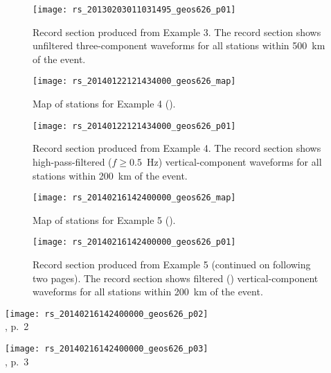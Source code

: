 \documentclass[11pt,titlepage,fleqn]{article}
\begin{document}
\clearpage\pagebreak
\begin{figure}
\hspace{-1.25cm}
\texttt{[image: rs\_20130203011031495\_geos626\_p01]}
\caption[]
{{
Record section produced from Example 3.
The record section shows unfiltered three-component waveforms for all stations within 500~km of the event.
}}
\label{fig:rs_ex03}
\end{figure}


\clearpage\pagebreak
\begin{figure}
\centering
\texttt{[image: rs\_20140122121434000\_geos626\_map]}
\caption[]
{{
Map of stations for Example 4 ().
}}
\label{fig:map_ex04}
\end{figure}

\clearpage\pagebreak
\begin{figure}
\hspace{-1.25cm}
\texttt{[image: rs\_20140122121434000\_geos626\_p01]}
\caption[]
{{
Record section produced from Example 4.
The record section shows high-pass-filtered ($f \ge 0.5$~Hz) vertical-component waveforms for all stations within 200~km of the event.
}}
\label{fig:rs_ex04}
\end{figure}


\clearpage\pagebreak
\begin{figure}
\centering
\texttt{[image: rs\_20140216142400000\_geos626\_map]}
\caption[]
{{
Map of stations for Example 5 ().
}}
\label{fig:map_ex05}
\end{figure}

\clearpage\pagebreak
\begin{figure}
\hspace{-1cm}
\texttt{[image: rs\_20140216142400000\_geos626\_p01]}
\caption[]
{{
Record section produced from Example 5 (continued on following two pages).
The record section shows filtered () vertical-component waveforms for all stations within 200~km of the event.
}}
\label{fig:rs_ex05}
\end{figure}

\clearpage\pagebreak
\hspace{-1.25cm}
\texttt{[image: rs\_20140216142400000\_geos626\_p02]} \\
, p.~2

\clearpage\pagebreak
\hspace{-1.25cm}
\texttt{[image: rs\_20140216142400000\_geos626\_p03]} \\
, p.~3
\end{document}
